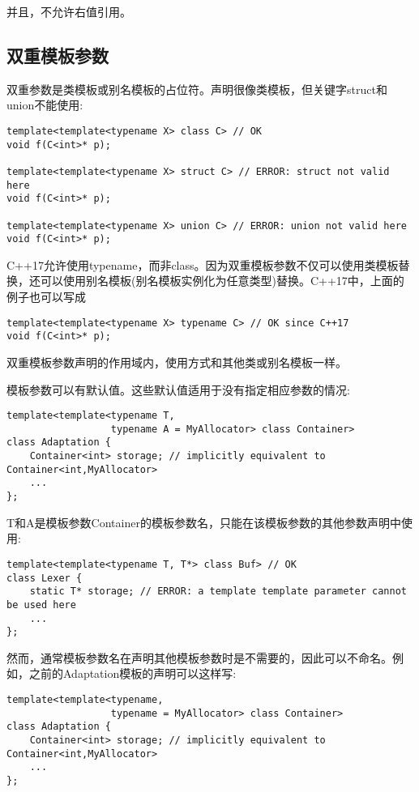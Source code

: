 并且，不允许右值引用。

\subsection{双重模板参数}

双重参数是类模板或别名模板的占位符。声明很像类模板，但关键字struct和union不能使用:

\begin{lstlisting}[style=styleCXX]
template<template<typename X> class C> // OK
void f(C<int>* p);

template<template<typename X> struct C> // ERROR: struct not valid here
void f(C<int>* p);

template<template<typename X> union C> // ERROR: union not valid here
void f(C<int>* p);
\end{lstlisting}

C++17允许使用typename，而非class。因为双重模板参数不仅可以使用类模板替换，还可以使用别名模板(别名模板实例化为任意类型)替换。C++17中，上面的例子也可以写成

\begin{lstlisting}[style=styleCXX]
template<template<typename X> typename C> // OK since C++17
void f(C<int>* p);
\end{lstlisting}

双重模板参数声明的作用域内，使用方式和其他类或别名模板一样。

模板参数可以有默认值。这些默认值适用于没有指定相应参数的情况:

\begin{lstlisting}[style=styleCXX]
template<template<typename T,
				  typename A = MyAllocator> class Container>
class Adaptation {
	Container<int> storage; // implicitly equivalent to Container<int,MyAllocator>
	...
};
\end{lstlisting}

T和A是模板参数Container的模板参数名，只能在该模板参数的其他参数声明中使用:

\begin{lstlisting}[style=styleCXX]
template<template<typename T, T*> class Buf> // OK
class Lexer {
	static T* storage; // ERROR: a template template parameter cannot be used here
	...
};
\end{lstlisting}

然而，通常模板参数名在声明其他模板参数时是不需要的，因此可以不命名。例如，之前的Adaptation模板的声明可以这样写:

\begin{lstlisting}[style=styleCXX]
template<template<typename,
				  typename = MyAllocator> class Container>
class Adaptation {
	Container<int> storage; // implicitly equivalent to Container<int,MyAllocator>
	...
};
\end{lstlisting}

